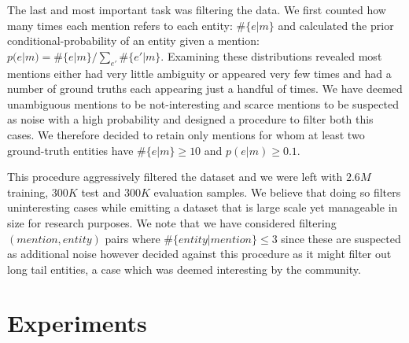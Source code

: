 \documentclass[11pt]{article}
\begin{document}
The last and most important task was filtering the data. We first counted how many times each mention refers to each entity: $\#\{e|m\}$ and calculated the prior conditional-probability of an entity given a mention: $p(e|m)=\#\{e|m\}/\sum_{e'}\#\{e'|m\}$. Examining these distributions revealed most mentions either had very little ambiguity or appeared very few times and had a number of ground truths each appearing just a handful of times. We have deemed unambiguous mentions to be not-interesting and scarce mentions to be suspected as noise with a high probability and designed a procedure to filter both this cases. We therefore decided to retain only mentions for whom at least two ground-truth entities have $\#\{e|m\}\ge 10$ and $p(e|m)\ge0.1$. 

This procedure aggressively filtered the dataset and we were left with $2.6M$ training, $300K$ test and $300K$ evaluation samples. We believe that doing so filters uninteresting cases while emitting a dataset that is large scale yet manageable in size for research purposes. We note that we have considered filtering $(mention,entity)$ pairs where $\#\{entity|mention\}\le 3$ since these are suspected as additional noise however decided against this procedure as it might filter out long tail entities, a case which was deemed interesting by the community.

\section{Experiments}



\end{document}
